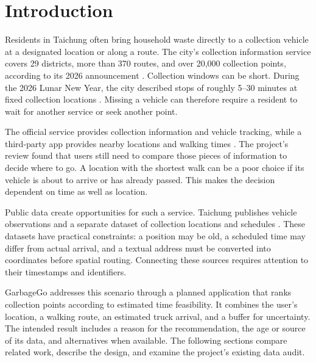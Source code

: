 \section{Introduction}\label{sec:intro}
Residents in Taichung often bring household waste directly to a collection vehicle at a designated location or along a route. The city's collection information service covers 29 districts, more than 370 routes, and over 20,000 collection points, according to its 2026 announcement \cite{tcepb2026cleaner}. Collection windows can be short. During the 2026 Lunar New Year, the city described stops of roughly 5--30 minutes at fixed collection locations \cite{tcepb2026spring}. Missing a vehicle can therefore require a resident to wait for another service or seek another point.

The official service provides collection information and vehicle tracking, while a third-party app provides nearby locations and walking times \cite{tcepb2026cleaner,appstore_private}. The project's review found that users still need to compare those pieces of information to decide where to go. A location with the shortest walk can be a poor choice if its vehicle is about to arrive or has already passed. This makes the decision dependent on time as well as location.

Public data create opportunities for such a service. Taichung publishes vehicle observations and a separate dataset of collection locations and schedules \cite{dataset83558,dataset84004}. These datasets have practical constraints: a position may be old, a scheduled time may differ from actual arrival, and a textual address must be converted into coordinates before spatial routing. Connecting these sources requires attention to their timestamps and identifiers.

GarbageGo addresses this scenario through a planned application that ranks collection points according to estimated time feasibility. It combines the user's location, a walking route, an estimated truck arrival, and a buffer for uncertainty. The intended result includes a reason for the recommendation, the age or source of its data, and alternatives when available. The following sections compare related work, describe the design, and examine the project's existing data audit.
